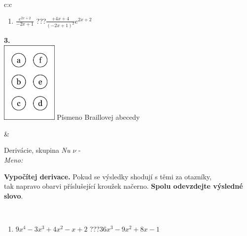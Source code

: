 \documentclass[10pt]{report}
\begin{document}
\begin{tabular}{c:c}
\begin{minipage}[c][104.5mm][t]{0.5\linewidth}
\begin{center}
\begin{minipage}{0.79\linewidth}
\begin{center}
\begin{varwidth}{\linewidth}
\begin{enumerate}
\item $\frac{e^{2x+2}}{-2x+1}$\quad \dotfill\; ???\;\dotfill \quad $\frac{+4x+4}{(-2x+1)^2}e^{2x+2}$
\end{enumerate}
\end{varwidth}
\end{center}
\end{minipage}
\begin{minipage}{0.20\linewidth}
\begin{center}
{\Huge\bfseries 3.} \\[2mm]
\includegraphics[height=40mm]{../images/braille.png}
{\small Písmeno Braillovej abecedy}
\end{center}
\end{minipage}
\end{center}
\end{minipage}
&
\begin{minipage}[c][104.5mm][t]{0.5\linewidth}
\begin{center}
\vspace{7mm}
{\huge Derivácie, skupina \textit{Nu $\nu$} -}\\[5mm]
\textit{Meno:}\phantom{xxxxxxxxxxxxxxxxxxxxxxxxxxxxxxxxxxxxxxxxxxxxxxxxxxxxxxxxxxxxxxxxx}\\[5mm]
\begin{minipage}{0.95\linewidth}
\begin{center}
\textbf{Vypočítej derivace.} Pokud se výsledky shodují s těmi za otazníky,\\tak napravo obarvi příslušející kroužek načerno. \textbf{Spolu odevzdejte výsledné slovo}.
\end{center}
\end{minipage}
\\[1mm]
\begin{minipage}{0.79\linewidth}
\begin{center}
\begin{varwidth}{\linewidth}
\begin{enumerate}
\normalsize
\item $9x^4-3x^3+4x^2-x+2$\quad \dotfill\; ???\;\dotfill \quad $36x^3-9x^2+8x-1$

\end{enumerate}
\end{varwidth}
\end{center}
\end{minipage}
\end{center}
\end{minipage}
\end{tabular}
\end{document}
